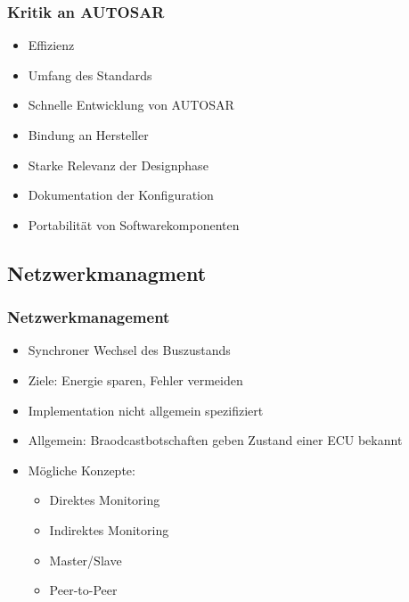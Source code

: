 \documentclass[]{beamer}
\begin{document}
\begin{frame}
\frametitle{Kritik an AUTOSAR}
    \begin{itemize}
        \item Effizienz
        \item Umfang des Standards
        \item Schnelle Entwicklung von AUTOSAR
        \item Bindung an Hersteller
        \item Starke Relevanz der Designphase
        \item Dokumentation der Konfiguration
        \item Portabilität von Softwarekomponenten
    \end{itemize}
\end{frame}




\subsection{Netzwerkmanagment}
\begin{frame}
\frametitle{Netzwerkmanagement}
    \begin{itemize}
        \item Synchroner Wechsel des Buszustands
        \item Ziele: Energie sparen, Fehler vermeiden
        \item Implementation nicht allgemein spezifiziert
        \item Allgemein: Braodcastbotschaften geben Zustand einer ECU bekannt
        \item Mögliche Konzepte:
        \begin{itemize}
            \item Direktes Monitoring
            \item Indirektes Monitoring
            \item Master/Slave
            \item Peer-to-Peer
        \end{itemize}
    \end{itemize}
\end{frame}
\end{document}
